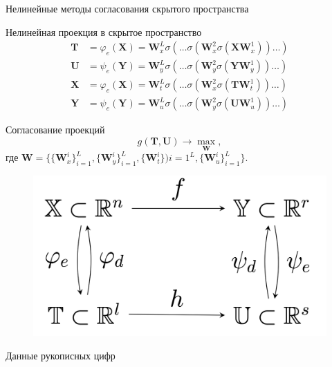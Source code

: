 \documentclass[9pt]{beamer}
\newcommand{\bT}{\mathbf{T}}
\newcommand{\bU}{\mathbf{U}}
\newcommand{\bW}{\mathbf{W}}
\newcommand{\bX}{\mathbf{X}}
\newcommand{\bY}{\mathbf{Y}}
\begin{document}
\begin{frame}{Нелинейные методы согласования скрытого пространства}
	
	\begin{minipage}{.65\linewidth}
		\begin{block}{Нелинейная проекция в скрытое пространство}
			\vspace{-0.3cm}
			\begin{align*}
				\bT &= \varphi_e(\bX) =  \bW_x^L \sigma(\dots \sigma(\bW_x^2 \sigma(\bX \bW_x^1)) \dots ) \\
				\bU &= \psi_e(\bY) =  \bW_y^L \sigma(\dots \sigma(\bW_y^2 \sigma(\bY \bW_y^1)) \dots ) \\
				\bX &= \varphi_e(\bX) =  \bW_t^L \sigma(\dots \sigma(\bW_x^2 \sigma(\bT \bW_t^1)) \dots ) \\
				\bY &= \psi_e(\bY) =  \bW_u^L \sigma(\dots \sigma(\bW_y^2 \sigma(\bU \bW_u^1)) \dots )
			\end{align*}
			\vspace{-0.3cm}
		\end{block}
		\begin{block}{Согласование проекций}
		\[
		g(\bT, \bU) \rightarrow \max_{\bW},
		\]
		где $\bW = \{\{\bW_x^i\}_{i=1}^L, \{\bW_y^i\}_{i=1}^L, \{\bW_t^i\}){i=1}^L, \{\bW_u^i\}_{i=1}^L\}$.
		\end{block}	
	\end{minipage}%
	\begin{minipage}{.35\linewidth}
		\begin{figure}
			\includegraphics[width=1.0\linewidth]{figs/decoding_scheme}
		\end{figure}
	\begin{block}{Данные рукописных цифр}
		\begin{figure}

\end{figure}
\end{block}
\end{minipage}
\end{frame}
\end{document}
